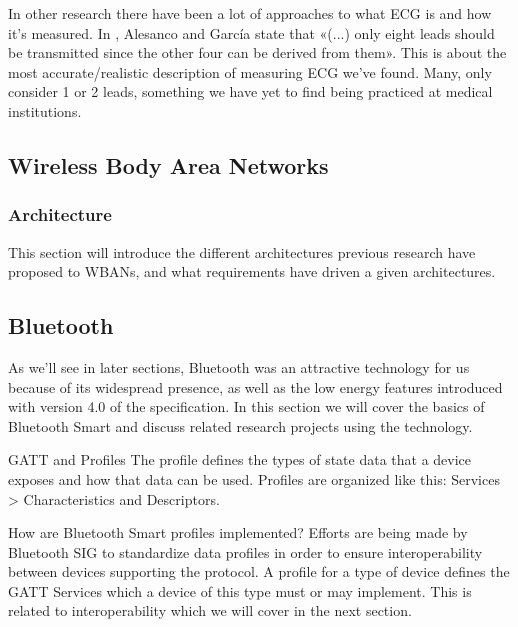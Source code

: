 In other research there have been a lot of approaches to what ECG is and how it's measured. In \cite{2010_Clinical_Assessment_of_Wireless_ECG_Transmission_in_Real-Time_Cardiac_Telemonitoring_15}, Alesanco and García state that «(...) only eight leads should be transmitted since the other four can be derived from them». This is about the most accurate/realistic description of measuring ECG we've found. Many, \cite{Artikler_med_1-2_leads_16} only consider 1 or 2 leads, something we have yet to find being practiced at medical institutions.


\subsection{Wireless Body Area Networks} %
\label{sub:wireless_body_area_networks}

\subsubsection{Architecture} %
\label{ssub:architecture}

This section will introduce the different architectures previous research have proposed to WBANs, and what requirements have driven a given architectures. 



\subsection{Bluetooth} %
\label{sub:bluetooth}

As we'll see in later sections, Bluetooth was an attractive technology for us because of its widespread presence, as well as the low energy features introduced with version 4.0 of the specification. In this section we will cover the basics of Bluetooth Smart and discuss related research projects using the technology.

GATT and Profiles
The profile defines the types of state data that a device exposes and how that data can be used. Profiles are organized like this: 
Services > Characteristics and Descriptors.

How are Bluetooth Smart profiles implemented? Efforts are being made by Bluetooth SIG to standardize data profiles in order to ensure interoperability between devices supporting the protocol. A profile for a type of device defines the GATT Services which a device of this type must or may implement. This is related to interoperability which we will cover in the next section.

